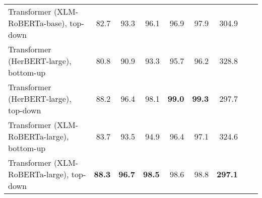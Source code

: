 \begin{table}[ht!]
{\begin{tabular}{lrrrrrrrr}
  Transformer (XLM-RoBERTa-base), top-down & 82.7 & 93.3 & 96.1 & 96.9 & 97.9 & 304.9 \\ 
  Transformer (HerBERT-large), bottom-up & 80.8 & 90.9 & 93.3 & 95.7 & 96.2 & 328.8 \\ 
  Transformer (HerBERT-large), top-down & 88.2 & 96.4 & 98.1 & \textbf{99.0} & \textbf{99.3} & 297.7 \\ 
  Transformer (XLM-RoBERTa-large), bottom-up & 83.7 & 93.5 & 94.9 & 96.4 & 97.1 & 324.6 \\ 
  Transformer (XLM-RoBERTa-large), top-down & \textbf{88.3} & \textbf{96.7} & \textbf{98.5} & 98.6 & 98.8 & \textbf{297.1} \\ 
   \hline
\end{tabular}
}
\end{table}




